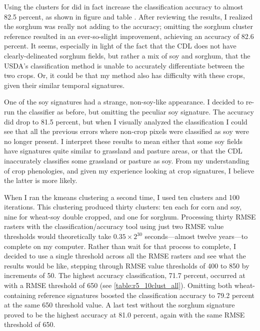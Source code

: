 Using the clusters for did in fact increase the classification accuracy to almost 82.5 percent, as shown in figure  and table . After reviewing the results, I realized the sorghum was really not adding to the accuracy; omitting the sorghum cluster reference resulted in an ever-so-slight improvement, achieving an accuracy of 82.6 percent. It seems, especially in light of the fact that the CDL does not have clearly-delineated sorghum fields, but rather a mix of soy and sorghum, that the USDA’s classification method is unable to accurately differentiate between the two crops. Or, it could be that my method also has difficulty with these crops, given their similar temporal signatures. %

One of the soy signatures had a strange, non-soy-like appearance. I decided to re-run the classifier as before, but omitting the peculiar soy signature. The accuracy did drop to 81.5 percent, but when I visually analyzed the classification I could see that all the previous errors where non-crop pixels were classified as soy were no longer present. I interpret these results to mean either that some soy fields have signatures quite similar to grassland and pasture areas, or that the CDL inaccurately classifies some grassland or pasture as soy. From my understanding of crop phenologies, and given my experience looking at crop signatures, I believe the latter is more likely.  %

When I ran the kmeans clustering a second time, I used ten clusters and 100 iterations. This clustering produced thirty clusters: ten each for corn and soy, nine for wheat-soy double cropped, and one for sorghum. Processing thirty RMSE rasters with the classification/accuracy tool using just two RMSE value thresholds would theoretically take $0.35\times2^{30}$ seconds---almost twelve years---to complete on my computer. Rather than wait for that process to complete, I decided to use a single threshold across all the RMSE rasters and see what the results would be like, stepping through RMSE value thresholds of 400 to 850 by increments of 50. The highest accuracy classification, 71.7 percent, occurred at with a RMSE threshold of 650 (see \autoref{table:r5_10clust_all}). Omitting both wheat-containing reference signatures boosted the classification accuracy to 79.2 percent at the same 650 threshold value. A last test without the sorghum signature proved to be the highest accuracy at 81.0 percent, again with the same RMSE threshold of 650.

